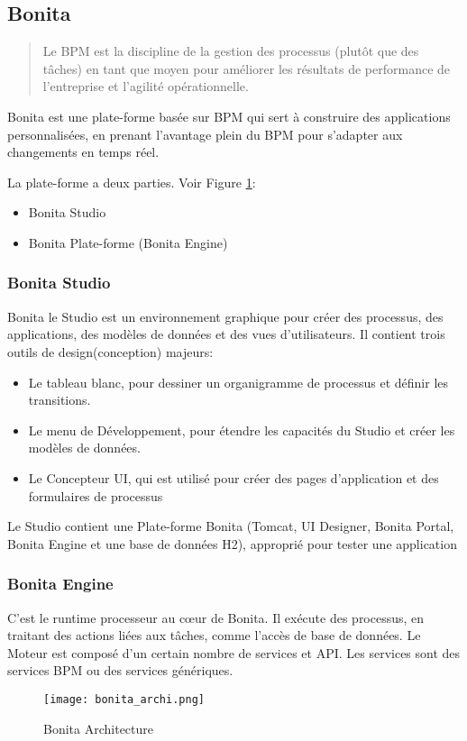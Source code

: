 \subsection{Bonita}
\begin{quotation}
Le BPM est la discipline de la gestion des processus (plutôt que des tâches) en tant que moyen pour améliorer les résultats de performance de l'entreprise et l'agilité opérationnelle. \cite{gartner_glossary}
\end{quotation}

Bonita est une plate-forme basée sur BPM qui sert à construire des applications personnalisées, en prenant l'avantage plein du BPM pour s'adapter aux changements en temps réel.

La plate-forme a deux parties. Voir Figure \ref{fig:bonita_archi}:
\begin{itemize}
  \item Bonita Studio
  \item Bonita Plate-forme (Bonita Engine)
\end{itemize}

\subsubsection{Bonita Studio}
Bonita le Studio est un environnement graphique pour créer des processus, des applications, des modèles de données et des vues d'utilisateurs. Il contient trois outils de design(conception) majeurs:

\begin{itemize}
  \item Le tableau blanc, pour dessiner un organigramme de processus et définir les transitions.
  \item Le menu de Développement, pour étendre les capacités du Studio et créer les modèles de données.
  \item Le Concepteur UI, qui est utilisé pour créer des pages d'application et des formulaires de processus
\end{itemize}

Le Studio contient une Plate-forme Bonita (Tomcat, UI Designer, Bonita Portal, Bonita Engine et une base de données H2), approprié pour tester une application

\subsubsection{Bonita Engine}
C'est le runtime processeur au cœur de Bonita. Il exécute des processus, en traitant des actions liées aux tâches, comme l'accès de base de données. Le Moteur est composé d'un certain nombre de services et API. Les services sont des services BPM ou des services génériques.

\begin{figure}[!ht]
\centering
\texttt{[image: bonita\_archi.png]}
\caption{Bonita Architecture}
\label{fig:bonita_archi}
\end{figure}
